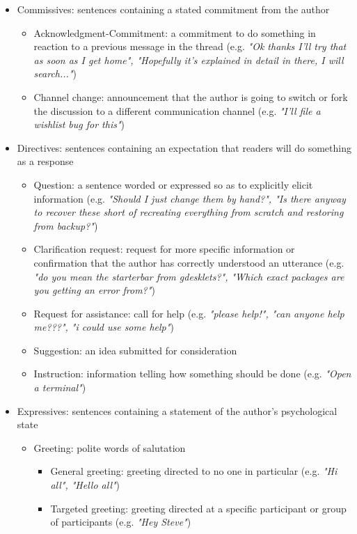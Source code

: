 \documentclass[11pt]{article}
\begin{document}
\begin{itemize}
	\item Commissives: sentences containing a stated commitment from the author
		\begin{itemize}
			\item Acknowledgment-Commitment: a commitment to do something in reaction to a previous message in the thread (e.g. \textit{"Ok thanks I'll try that as soon as I get home", "Hopefully it's explained in detail in there, I will search..."})
			\item Channel change: announcement that the author is going to switch or fork the discussion to a different communication channel (e.g. \textit{"I'll file a wishlist bug for this"})
		\end{itemize}
	\item Directives: sentences containing an expectation that readers will do something as a response
		\begin{itemize}
			\item Question: a sentence worded or expressed so as to explicitly elicit information (e.g. \textit{"Should I just change them by hand?", "Is there anyway to recover these short of recreating everything from scratch and restoring from backup?"})
				\item Clarification request: request for more specific information or confirmation that the author has correctly understood an utterance (e.g. \textit{"do you mean the starterbar from gdesklets?", "Which exact packages are you getting an error from?"})
			\item Request for assistance: call for help (e.g. \textit{"please help!", "can anyone help me???", "i could use some help"})
			\item Suggestion: an idea submitted for consideration
			\item Instruction: information telling how something should be done (e.g. \textit{"Open a terminal"})
		\end{itemize}
	\item Expressives: sentences containing a statement of the author's psychological state
		\begin{itemize}
			\item Greeting: polite words of salutation
				\begin{itemize}
					\item General greeting: greeting directed to no one in particular (e.g. \textit{"Hi all", "Hello all"})
					\item Targeted greeting: greeting directed at a specific participant or group of participants (e.g. \textit{"Hey Steve"})

\end{itemize}
\end{itemize}
\end{itemize}
\end{document}
